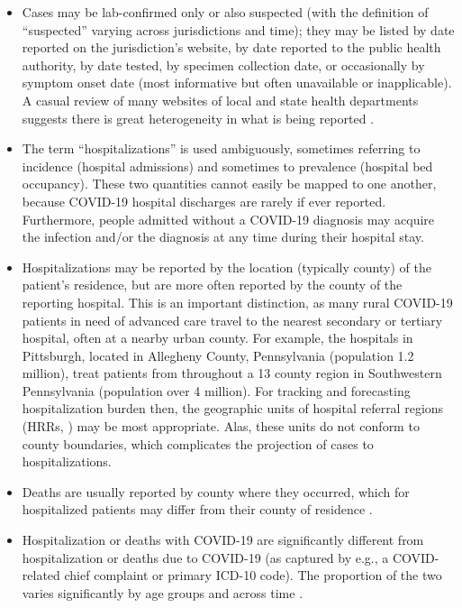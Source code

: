 \documentclass{article}
\begin{document}
\begin{itemize}
\item Cases may be lab-confirmed only or also suspected (with the definition of
  ``suspected'' varying across jurisdictions and time); they may be listed by
  date reported on the jurisdiction's website, by date reported to the public
  health authority, by date tested, by specimen collection date, or occasionally
  by symptom onset date (most informative but often unavailable or
  inapplicable). A casual review of many websites of local and state health
  departments suggests there is great heterogeneity in what is being reported
  \citep{Simon:2021}.  

\item The term ``hospitalizations'' is used ambiguously, sometimes referring to
  incidence (hospital admissions) and sometimes to prevalence (hospital bed
  occupancy).  These two quantities cannot easily be mapped to one another, 
  because COVID-19 hospital discharges are rarely if ever reported.
  Furthermore, people admitted without a COVID-19 diagnosis may acquire the
  infection and/or the diagnosis at any time during their hospital stay.   

\item Hospitalizations may be reported by the location (typically county) of the
  patient's residence, but are more often reported by the county of the
  reporting hospital.  This is an important distinction, as many rural COVID-19
  patients in need of advanced care travel to the nearest secondary or tertiary
  hospital, often at a nearby urban county.  For example, the hospitals in
  Pittsburgh, located in Allegheny County, Pennsylvania (population 1.2
  million), treat patients from throughout a 13 county region in Southwestern
  Pennsylvania (population over 4 million).  For tracking and forecasting
  hospitalization burden then, the geographic units of hospital referral regions
  (HRRs, \citep{DartmouthHRR}) may be most appropriate.  Alas, these units do
  not conform to county boundaries, which complicates the projection of cases to
  hospitalizations.  

\item Deaths are usually reported by county where they occurred, which for
  hospitalized patients may differ from their county of residence \citep{NCHS}.

\item Hospitalization or deaths with COVID-19 are significantly different from
  hospitalization or deaths due to COVID-19 (as captured by e.g., a
  COVID-related chief complaint or primary ICD-10 code).  The proportion of the
  two varies significantly by age groups and across time \citep{Fillmore:2021}.


\end{itemize}
\end{document}
